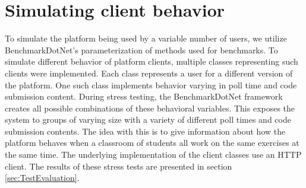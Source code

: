 
\section{Simulating client behavior}
To simulate the platform being used by a variable number of users, we utilize BenchmarkDotNet's parameterization of methods used for benchmarks. 
To simulate different behavior of platform clients, multiple classes representing such clients were implemented.
Each class represents a user for a different version of the platform.
One such class implements behavior varying in poll time and code submission content.
During stress testing, the BenchmarkDotNet framework creates all possible combinations of these behavioral variables.
This exposes the system to groups of varying size with a variety of different poll times and code submission contents.
The idea with this is to give information about how the platform behaves when a classroom of students all work on the same exercises at the same time.
The underlying implementation of the client classes use an HTTP client.
The results of these stress tests are presented in section \ref{sec:TestEvaluation}.

